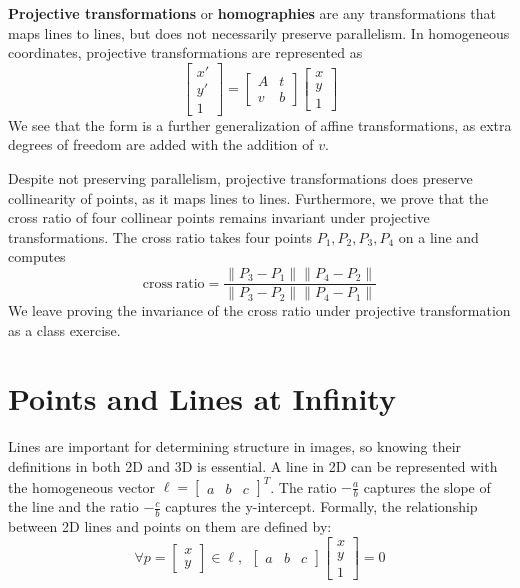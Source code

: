 \documentclass[a4paper, 12pt]{article}
\renewcommand\emph{\textbf}
\begin{document}
\emph{Projective transformations} or \emph{homographies} are any transformations that maps lines to lines, but does not necessarily preserve parallelism. In homogeneous coordinates, projective transformations are represented as
\begin{equation*}
    \begin{bmatrix}x'\\y'\\1\end{bmatrix} = \begin{bmatrix}A & t\\ v & b\end{bmatrix}\begin{bmatrix}x\\y\\1\end{bmatrix}
\end{equation*}
We see that the form is a further generalization of affine transformations, as extra degrees of freedom are added with the addition of $v$. 

Despite not preserving parallelism, projective transformations does preserve collinearity of points, as it maps lines to lines. Furthermore, we prove that the cross ratio of four collinear points remains invariant under projective transformations. The cross ratio takes four points $P_1, P_2, P_3, P_4$ on a line and computes
\begin{equation}
    \mathrm{cross\ ratio} = \frac{\|P_3-P_1\|\|P_4-P_2\|}{\|P_3-P_2\|\|P_4-P_1\|}
\end{equation}
We leave proving the invariance of the cross ratio under projective transformation as a class exercise.

\section{Points and Lines at Infinity}
Lines are important for determining structure in images, so knowing their definitions in both 2D and 3D is essential. A line in 2D can be represented with the homogeneous vector $\ell = \begin{bmatrix}a & b & c \end{bmatrix}^T$. The ratio $-\frac{a}{b}$ captures the slope of the line and the ratio $-\frac{c}{b}$ captures the y-intercept. Formally, the relationship between 2D lines and points on them are defined by:
\begin{equation}
\forall p = \begin{bmatrix}x\\y\end{bmatrix} \in \ell,\ \  \begin{bmatrix}a & b & c\end{bmatrix}\begin{bmatrix}x\\y\\1\end{bmatrix} = 0
\end{equation}
\end{document}
